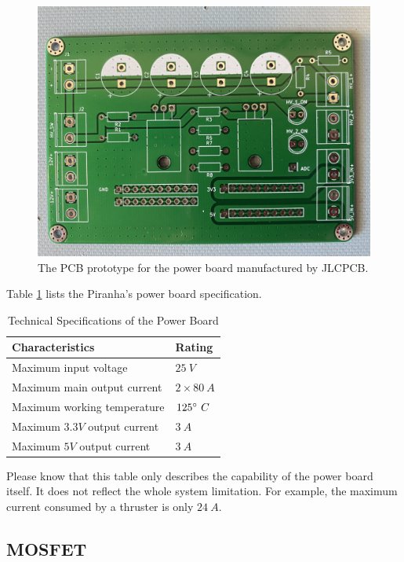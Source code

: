 \begin{figure}[H]
    \centering
    \includegraphics[width=.8\textwidth]{images/03power-module-pcb.JPG}
    \caption{The PCB prototype for the power board manufactured by JLCPCB.}
    \label{fig:03power-pcb}
\end{figure}

Table \ref{table:03powerboard} lists the Piranha's power board specification.

\begin{table}[ht]
\caption{Technical Specifications of the Power Board} %
\centering %
\renewcommand{\arraystretch}{0.8}
\begin{tabular}{l l} %
\hline
\textbf{Characteristics} & \textbf{Rating} \\ [0.5ex] %
\hline %
Maximum input voltage  & $25\ V$ \\
Maximum main output current & $2\times 80\ A$ \\
Maximum working temperature & $125\degree\ C$ \\
Maximum $3.3V$ output current & $3\ A$ \\
Maximum $5V$ output current & $3\ A$ \\
\hline %
\end{tabular}
\label{table:03powerboard} %
\end{table}

Please know that this table only describes the capability of the power board itself. It does not reflect the whole system limitation. For example, the maximum current consumed by a thruster is only $24\ A$.

\subsection{MOSFET}

